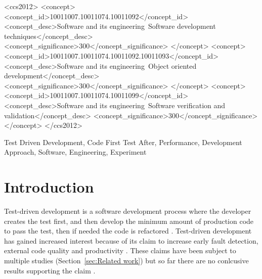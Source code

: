 \documentclass{sig-alternate-05-2015}
\begin{document}
%
%
\begin{CCSXML}
<ccs2012>
<concept>
<concept_id>10011007.10011074.10011092</concept_id>
<concept_desc>Software and its engineering~Software development techniques</concept_desc>
<concept_significance>300</concept_significance>
</concept>
<concept>
<concept_id>10011007.10011074.10011092.10011093</concept_id>
<concept_desc>Software and its engineering~Object oriented development</concept_desc>
<concept_significance>300</concept_significance>
</concept>
<concept>
<concept_id>10011007.10011074.10011099</concept_id>
<concept_desc>Software and its engineering~Software verification and validation</concept_desc>
<concept_significance>300</concept_significance>
</concept>
</ccs2012>
\end{CCSXML}



%
%

%
%
\printccsdesc

\begin{keywords}
Test Driven Development, Code First Test After, Performance, Development Approach, Software, Engineering, \newline Experiment
\end{keywords}

\section{Introduction}
Test-driven development is a software development process where the developer creates the test first, and then develop the minimum amount of production code to pass the test, then if needed the code is refactored \cite{beck1}. Test-driven development has gained increased interest because of its claim to increase early fault detection, external code quality and productivity \cite{astels1}. These claims have been subject to multiple studies (Section~\ref{sec:Related work}) but so far there are no conlcusive results supporting the claim \cite{shull1}.
\end{document}
